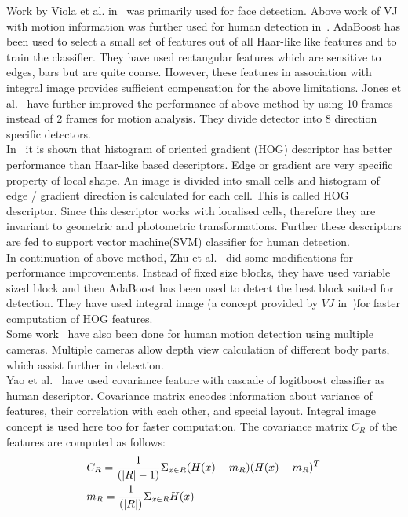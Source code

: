 \indent Work by Viola et al. in~\cite{17} was primarily used for
face detection.  Above work of VJ with motion information was further
used for human detection in~\cite{16}.  AdaBoost has been used to
select a small set of features out of all Haar-like like features and to
train the classifier. They have used rectangular features which are
sensitive to edges, bars but are quite coarse. However, these features
in association with integral image provides sufficient compensation for
the above limitations. Jones et al.~\cite{26} have further improved
the performance of above method by using 10 frames instead of 2 frames
for motion analysis. They divide detector into 8 direction specific
detectors.\\
\indent In~\cite{20, 21} it is shown that histogram of oriented
gradient (HOG) descriptor has better performance than Haar-like based
descriptors. Edge or gradient are very specific property of local shape.
An image is divided into small cells and histogram of edge / gradient
direction is calculated for each cell. This is called HOG descriptor.
Since this descriptor works with localised cells, therefore they are
invariant to geometric and photometric transformations. Further these
descriptors are fed to support vector machine(SVM) classifier for human
detection.\\
\indent In continuation of above method, Zhu et al.~\cite{20} did some
modifications for performance improvements. Instead of fixed size
blocks, they have used variable sized block and then AdaBoost has been
used to detect the best block suited for detection. They have used
integral image (a concept provided by $VJ$ in~\cite{17})for faster
computation of HOG features.\\
\indent Some work~\cite{30} have also been done for human motion
detection using multiple cameras. Multiple cameras allow depth view
calculation of different body parts, which assist further in
detection.\\
\indent Yao et al.~\cite{25} have used covariance feature with cascade of
logitboost classifier as human descriptor. Covariance matrix
encodes information about variance of features, their correlation with
each other, and special layout. Integral image concept is used here too
for faster computation. The covariance matrix $C_R$ of the features are
computed as follows:
\begin{equation}
\begin{aligned}
& C_R = {1 \over {(|R| - 1)}} \Sigma _{x \in R} (H(x) - m_R) (H(x) - m_R)^T\\
& m_R = {1 \over {(|R|)}} \Sigma _{x \in R} H(x)
\end{aligned}
\end{equation}
